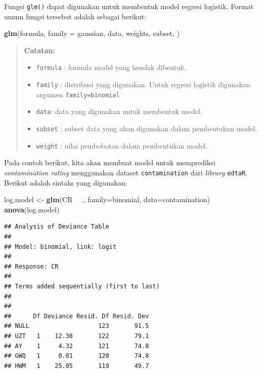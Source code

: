 \documentclass[]{book}
\newenvironment{Shaded}{\begin{snugshade}}{\end{snugshade}}
\newcommand{\DataTypeTok}[1]{\textcolor[rgb]{0.13,0.29,0.53}{#1}}
\newcommand{\KeywordTok}[1]{\textcolor[rgb]{0.13,0.29,0.53}{\textbf{#1}}}
\newcommand{\NormalTok}[1]{#1}
\newcommand{\OperatorTok}[1]{\textcolor[rgb]{0.81,0.36,0.00}{\textbf{#1}}}
\newcommand{\StringTok}[1]{\textcolor[rgb]{0.31,0.60,0.02}{#1}}
\providecommand{\tightlist}{%
  \setlength{\itemsep}{0pt}\setlength{\parskip}{0pt}}
\theoremstyle{definition}
\theoremstyle{definition}
\theoremstyle{definition}
\theoremstyle{remark}
\begin{document}
Fungsi \texttt{glm()} dapat digunakan untuk membentuk model regresi logistik. Format umum fungsi tersebut adalah sebagai berikut:

\begin{Shaded}
\begin{Highlighting}[]
\KeywordTok{glm}\NormalTok{(formula, }\DataTypeTok{family =}\NormalTok{ gaussian, data, weights, subset,}
\NormalTok{    )}
\end{Highlighting}
\end{Shaded}

\begin{quote}
\textbf{Catatan:}

\begin{itemize}
\tightlist
\item
  \texttt{formula} : formula model yang hendak dibentuk.
\item
  \texttt{family} : distribusi yang digunakan. Untuk regresi logistik digunakan argumen \texttt{family=binomial}
\item
  \texttt{data}: data yang digunakan untuk membentuk model.
\item
  \texttt{subset} : subset data yang akan digunakan dalam pembentukan model.
\item
  \texttt{weight} : nilai pembobotan dalam pembentukan model.
\end{itemize}
\end{quote}

Pada contoh berikut, kita akan membuat model untuk memprediksi \emph{contamination rating} menggunakan dataset \texttt{contamination} dari \emph{library} \texttt{edtaR}. Berikut adalah sintaks yang digunakan:

\begin{Shaded}
\begin{Highlighting}[]
\NormalTok{log.model <-}\StringTok{ }\KeywordTok{glm}\NormalTok{(CR }\OperatorTok{~}\StringTok{ }\NormalTok{., }\DataTypeTok{family=}\NormalTok{binomial, }\DataTypeTok{data=}\NormalTok{contamination)}
\KeywordTok{anova}\NormalTok{(log.model)}
\end{Highlighting}
\end{Shaded}

\begin{verbatim}
## Analysis of Deviance Table
## 
## Model: binomial, link: logit
## 
## Response: CR
## 
## Terms added sequentially (first to last)
## 
## 
##      Df Deviance Resid. Df Resid. Dev
## NULL                   123       91.5
## UZT   1    12.38       122       79.1
## AY    1     4.32       121       74.8
## GWQ   1     0.01       120       74.8
## HWM   1    25.05       119       49.7
\end{verbatim}
\end{document}
